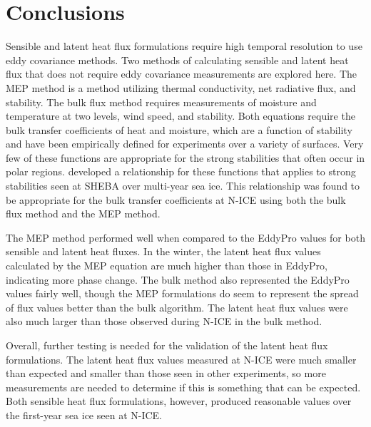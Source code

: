 
\section{Conclusions}
Sensible and latent heat flux formulations require high temporal resolution to use eddy covariance methods. Two methods of calculating sensible and latent heat flux that does not require eddy covariance measurements are explored here. The MEP method is a method utilizing thermal conductivity, net radiative flux, and  stability. The bulk flux method requires measurements of moisture and temperature at two levels, wind speed, and stability. Both equations require the bulk transfer coefficients of heat and moisture, which are a function of stability and have been empirically defined for experiments over a variety of surfaces. Very few of these functions are appropriate for the strong stabilities that often occur in polar regions. \citet{andreas:311} developed a relationship for these functions that applies to strong stabilities seen at SHEBA over multi-year sea ice. This relationship was found to be appropriate for the bulk transfer coefficients at N-ICE using both the bulk flux method and the MEP method. 

The MEP method performed well when compared to the EddyPro values for both sensible and latent heat fluxes. In the winter, the latent heat flux values calculated by the MEP equation are much higher than those in EddyPro, indicating  more phase change. The bulk method also represented the EddyPro values fairly well, though the MEP formulations do seem to represent the spread of flux values better than the bulk algorithm. The latent heat flux values were also much larger than those observed during N-ICE in the bulk method. 

Overall, further testing is needed for the validation of the latent heat flux formulations. The latent heat flux values measured at N-ICE were much smaller than expected and smaller than those seen in other experiments, so more measurements are needed to determine if this is something that can be expected. Both sensible heat flux formulations, however, produced reasonable values over the first-year sea ice seen at N-ICE. 










